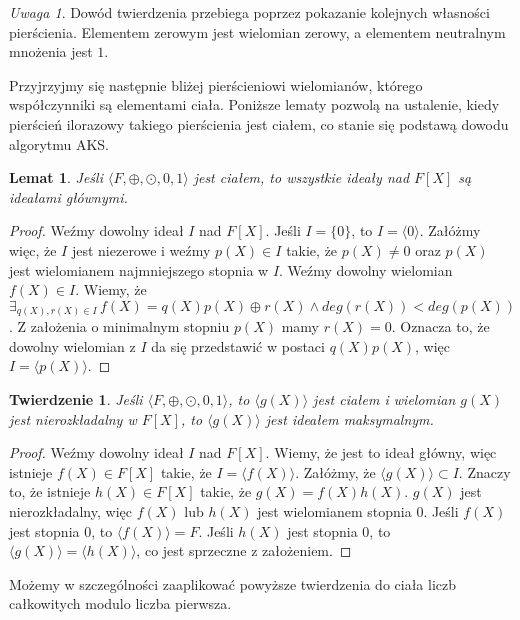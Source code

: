 \documentclass[polish,declaration,shortabstract]{iithesis}
\theoremstyle{definition}
\theoremstyle{remark} \newtheorem{observation}{Obserwacja}
\theoremstyle{plain} \newtheorem{theorem}{Twierdzenie}
\theoremstyle{plain} \newtheorem{lemma}{Lemat}
\theoremstyle{remark} \newtheorem*{remark*}{Uwaga}
\theoremstyle{reminder} \newtheorem*{reminder*}{Przypomnienie}
\begin{document}
\begin{remark*}
	Dowód twierdzenia przebiega poprzez pokazanie kolejnych własności pierścienia. Elementem zerowym jest wielomian zerowy, a elementem neutralnym mnożenia jest $1$.
\end{remark*}

Przyjrzyjmy się następnie bliżej pierścieniowi wielomianów, którego współczynniki są elementami ciała. Poniższe lematy pozwolą na ustalenie, kiedy pierścień ilorazowy takiego pierścienia jest ciałem, co stanie się podstawą dowodu algorytmu AKS.

\begin{lemma}\label{idealy_glowne0}
	Jeśli $\langle F, \oplus, \odot, 0, 1 \rangle$ jest ciałem, to wszystkie ideały nad $F[X]$ są ideałami głównymi.
\end{lemma}

\begin{proof}
	Weźmy dowolny ideał $I$ nad $F[X]$. Jeśli $I = \{0\}$, to $I = \langle0\rangle$. Załóżmy więc, że $I$ jest niezerowe i weźmy $p(X) \in I$ takie, że $p(X) \neq 0$ oraz $p(X)$ jest wielomianem najmniejszego stopnia w $I$. Weźmy dowolny wielomian $f(X) \in I$. Wiemy, że $\exists_{q(X), r(X) \in I} \, f(X) = q(X)p(X) \oplus r(X) \wedge deg(r(X)) < deg(p(X))$. Z założenia o minimalnym stopniu $p(X)$ mamy $r(X) = 0$. Oznacza to, że dowolny wielomian z $I$ da się przedstawić w postaci $q(X)p(X)$, więc $I = \langle p(X) \rangle$. 
\end{proof}

\begin{theorem}
	Jeśli $\langle F, \oplus, \odot, 0, 1 \rangle$, to $\langle g(X) \rangle$ jest ciałem i wielomian $g(X)$ jest nierozkładalny w $F[X]$, to $\langle g(X) \rangle$ jest ideałem maksymalnym.
\end{theorem}

\begin{proof}
	Weźmy dowolny ideał $I$ nad $F[X]$. Wiemy, że jest to ideał główny, więc istnieje $f(X) \in F[X]$ takie, że $I = \langle f(X) \rangle$. Załóżmy, że $\langle g(X) \rangle \subset I$. Znaczy to, że istnieje $h(X) \in F[X]$ takie, że $g(X) = f(X)h(X)$. $g(X)$ jest nierozkładalny, więc $f(X)$ lub $h(X)$ jest wielomianem stopnia $0$. Jeśli $f(X)$ jest stopnia $0$, to $\langle f(X) \rangle = F$. Jeśli $h(X)$ jest stopnia $0$, to $\langle g(X) \rangle = \langle h(X) \rangle$, co jest sprzeczne z założeniem.
\end{proof}

Możemy w szczególności zaaplikować powyższe twierdzenia do ciała liczb całkowitych modulo liczba pierwsza.
\end{document}
